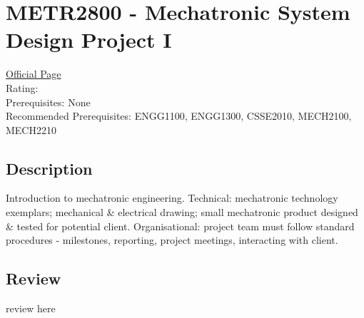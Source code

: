 \hypertarget{METR2800}{\section{METR2800 - Mechatronic System Design Project I}}

\large
\textcolor{turbo_purple}{\href{https://my.uq.edu.au/programs-courses/course.html?course_code=METR2800}{Official Page}} \\
Rating: \cstar\cstar\cstar\cstar\ostar \\
Prerequisites: None \\
Recommended Prerequisites: ENGG1100, ENGG1300, CSSE2010, MECH2100, MECH2210

\normalsize
\subsection*{Description}
Introduction to mechatronic engineering.
Technical: mechatronic technology exemplars; mechanical \& electrical drawing; small mechatronic product designed \& tested for potential client.
Organisational: project team must follow standard procedures - milestones, reporting, project meetings, interacting with client.

\subsection*{Review}
review here
